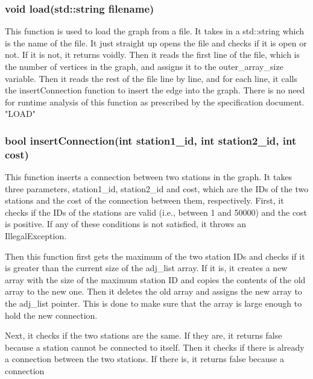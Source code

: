 \documentclass[a4paper]{article}
\begin{document}
		\subsubsection{{\color{orange} void } {\color{draculapurple}load}({\color{orange}std::string} filename)}
			This function is used to load the graph from a file. It takes in a {\color{orange}std::string} which is the name of the file.
			It just straight up opens the file and checks if it is open or not. If it is not, it returns voidly.
			Then it reads the first line of the file, which is the number of vertices in the graph, and assigns it to the {\color{draculapurple}outer\_array\_size} variable.
			Then it reads the rest of the file line by line, and for each line, it calls the {\color{draculapurple}insertConnection} function to insert the edge into the graph.
			There is no need for runtime analysis of this function as prescribed by the specification document.
			{\color{GoldenYellow}"LOAD"}
		
		\subsubsection{{\color{orange}bool} {\color{draculapurple}insertConnection}({\color{draculapurple}int} station1\_id, {\color{draculapurple}int} station2\_id, {\color{draculapurple}int} cost)}

			This function inserts a connection between two stations in the graph. It takes three parameters, 
			{\color{draculapurple}station1\_id}, {\color{draculapurple}station2\_id} and {\color{draculapurple}cost}, which are the IDs of the 
			two stations and the cost of the connection between them, respectively.
			First, it checks if the IDs of the stations are valid (i.e., between 1 and 50000) and the cost is positive.
			If any of these conditions is not satisfied, it throws an {\color{draculapurple}IllegalException}.

			Then this function first gets the maximum of the two station IDs and checks if it is greater than the current size of the 
			{\color{draculapurple}adj\_list} array. If it is, it creates a new array with the size of the maximum station ID and copies the
			contents of the old array to the new one. Then it deletes the old array and assigns the new array to the {\color{draculapurple}adj\_list}
			pointer. This is done to make sure that the array is large enough to hold the new connection.

			Next, it checks if the two stations are the same. If they are, it returns {\color{draculapurple}false} because a station cannot be connected to itself.
			Then it checks if there is already a connection between the two stations. If there is, it returns {\color{draculapurple}false} because a connection
\end{document}
